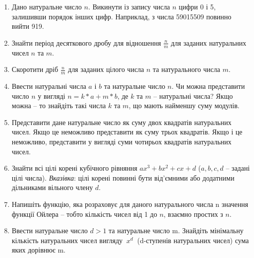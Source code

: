 \documentclass[]{article}
\makeatletter
\newcommand{\xslalph}[1]{\expandafter\@xslalph\csname c@#1\endcsname}
\newcommand{\@xslalph}[1]{%
    \ifcase#1\or а\or б\or в\or г\or д\or e\or є\or ж\or з\or i%
    \or й\or к\or л\or м\or н\or о\or п\or р\or с\or т%
    \or у\or ф\or х\or ц\or ч\or ш\or ю\or я\or аа\or бб\or вв %
    \else\@ctrerr\fi%
}
\makeatother
\begin{document}
\begin{enumerate}
\begin{enumerate}[label=\xslalph*)]

\item \(\max(\left| z_{1} \right|,\ldots,\left| z_{n} \right|),\) де
\(z_{i} = \left\{ \begin{matrix}
y_{i},\textup{ при }\left| y_{i} \right| \leq 2, \\
0.5,\textup{у інших випадках} \\
\end{matrix} \right.\ \);
\item \(\min(\left| z_{1} \right|,\ldots,\left| z_{n} \right|),\) де
\(z_{i} = \left\{ \begin{matrix}
 y_{i},\textup{ при}\ \left| y_{i} \right| \geq 1, \\
 2,\textup{у інших випадках} \\
\end{matrix} \right.\ \);
\item \(z_{1} + z_{2} + \ldots + z_{n},\) де
\(z_{i} = \left\{ \begin{matrix}
 y_{i},\textup{ при } {y}_{i} < 10, \\
 1,\textup{у інших випадках} \\
\end{matrix} \right.\ \)
 \end{enumerate}

\item

Дано натуральне число $n$. Викинути із запису числа $n$ цифри 0 і 5,
залишивши порядок інших цифр. Наприклад, з числа 59015509 повинно вийти
919.

\item
Знайти період десяткового дробу для відношення $\frac{n}{m}$ для заданих
натуральних чисел $n$ та $m$.
\item
Скоротити дріб $\frac{n}{m}$ для заданих цілого числа $n$ та натурального числа $m$.

\item
  Ввести натуральні числа $a$ і $b$ та натуральне число $n$. Чи можна
  представити число $n$ у вигляді $n= k*a + m*b$, де $k$ та $m$ -- натуральні
  числа? Якщо можна -- то знайдіть такі числа $k$ та $m$, що мають найменшу
  суму модулів.
\item
Представити дане натуральне число як суму двох квадратів натуральних
чисел. Якщо це неможливо представити як суму трьох квадратів. Якщо і це
неможливо, представити у вигляді суми чотирьох квадратів натуральних
чисел.
\item
 Знайти всі цілі корені кубічного рівняння $ax^3 + bx^2 + cx + d$ ($a,b,c,d$ 
-- задані цілі числа). \emph{Вказівка}: цілі корені повинні бути від'ємними
 або додатними дільниками вільного члену $d$.
\item
  Напишіть функцію, яка розраховує для даного натурального числа n
  значення функції Ойлера -- тобто кількість чисел від 1 до $n$, взаємно простих з
  $n$.
\item
Ввести натуральне число \(d > 1\) та натуральне число m. Знайдіть
мінімальну кількість натуральних чисел вигляду \(\ x^{d}\ \) (d-ступенів
натуральних чисел) сума яких дорівнює m.


\end{enumerate}
\end{document}

